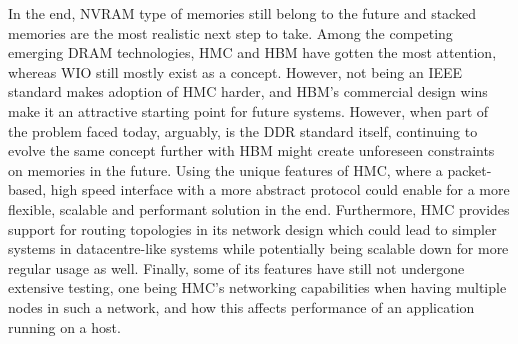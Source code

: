 In the end, NVRAM type of memories still belong to the future and stacked memories are the most realistic next step to take. Among the competing emerging DRAM technologies, HMC and HBM have gotten the most attention, whereas WIO still mostly exist as a concept. However, not being an IEEE standard makes adoption of HMC harder, and HBM's commercial design wins make it an attractive starting point for future systems. However, when part of the problem faced today, arguably, is the DDR standard itself, continuing to evolve the same concept further with HBM might create unforeseen constraints on memories in the future. Using the unique features of HMC, where a packet-based, high speed interface with a more abstract protocol could enable for a more flexible, scalable and performant solution in the end. Furthermore, HMC provides support for routing topologies in its network design which could lead to simpler systems in datacentre-like systems while potentially being scalable down for more regular usage as  well. Finally, some of its features have still not undergone extensive testing, one being HMC's networking capabilities when having multiple nodes in such a network, and how this affects performance of an application running on a host.


